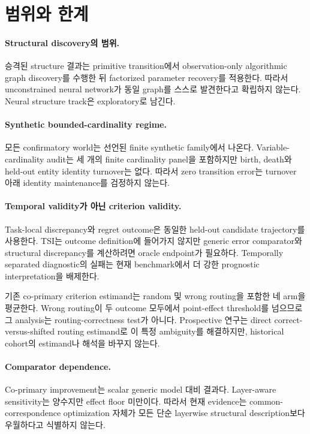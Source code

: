 \section{범위와 한계}
\label{sec:limitations}

\paragraph{Structural discovery의 범위.}
승격된 structure 결과는 primitive transition에서 observation-only algorithmic
graph discovery를 수행한 뒤 factorized parameter recovery를 적용한다. 따라서
unconstrained neural network가 동일 graph를 스스로 발견한다고 확립하지 않는다.
Neural structure track은 exploratory로 남긴다.

\paragraph{Synthetic bounded-cardinality regime.}
모든 confirmatory world는 선언된 finite synthetic family에서 나온다. Variable-
cardinality audit는 세 개의 finite cardinality panel을 포함하지만 birth, death와
held-out entity identity turnover는 없다. 따라서 zero transition error는 turnover
아래 identity maintenance를 검정하지 않는다.

\paragraph{Temporal validity가 아닌 criterion validity.}
Task-local discrepancy와 regret outcome은 동일한 held-out candidate
trajectory를 사용한다. TSI는 outcome definition에 들어가지 않지만 generic
error comparator와 structural discrepancy를 계산하려면 oracle endpoint가
필요하다. Temporally separated diagnostic의 실패는 현재 benchmark에서 더
강한 prognostic interpretation을 배제한다.

기존 co-primary criterion estimand는 random 및 wrong routing을 포함한 네 arm을
평균한다. Wrong routing이 두 outcome 모두에서 point-effect threshold를 넘으므로
그 analysis는 routing-correctness test가 아니다. Prospective 연구는 direct
correct-versus-shifted routing estimand로 이 특정 ambiguity를 해결하지만,
historical cohort의 estimand나 해석을 바꾸지 않는다.

\paragraph{Comparator dependence.}
Co-primary improvement는 scalar generic model 대비 결과다. Layer-aware
sensitivity는 양수지만 effect floor 미만이다. 따라서 현재 evidence는 common-
correspondence optimization 자체가 모든 단순 layerwise structural
description보다 우월하다고 식별하지 않는다.

